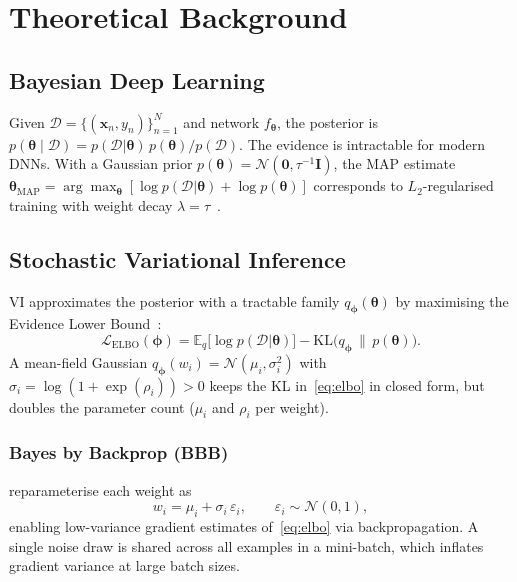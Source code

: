 \documentclass[12pt,a4paper]{article}
\newcommand{\btheta}{\bm{\theta}}
\newcommand{\cD}{\mathcal{D}}
\newcommand{\cN}{\mathcal{N}}
\newcommand{\KL}{\mathrm{KL}}
\newcommand{\ELBO}{\mathcal{L}_{\text{ELBO}}}
\newcommand{\MAP}{\text{MAP}}
\begin{document}
\section{Theoretical Background}
\label{sec:theory}

\subsection{Bayesian Deep Learning}

Given $\cD = \{(\bm{x}_n, y_n)\}_{n=1}^{N}$ and network $f_{\btheta}$, the
posterior is $p(\btheta \mid \cD) = p(\cD|\btheta)\,p(\btheta)/p(\cD)$. The
evidence is intractable for modern DNNs. With a Gaussian prior
$p(\btheta)=\cN(\bm{0},\tau^{-1}\mathbf{I})$, the MAP estimate
$\btheta_{\MAP} = \arg\max_{\btheta}[\log p(\cD|\btheta)+\log p(\btheta)]$
corresponds to $L_2$-regularised training with weight decay
$\lambda=\tau$~\citep{murphy2023pml}.

\subsection{Stochastic Variational Inference}

VI approximates the posterior with a tractable family $q_{\bm\phi}(\btheta)$
by maximising the Evidence Lower Bound~\citep{blundell2015weight,goan2020bayesian}:
\begin{equation}
  \ELBO(\bm\phi)
    = \mathbb{E}_{q}\!\bigl[\log p(\cD|\btheta)\bigr]
    - \KL\bigl(q_{\bm\phi}\,\|\,p(\btheta)\bigr).
  \label{eq:elbo}
\end{equation}
A mean-field Gaussian $q_{\bm\phi}(w_i) = \cN(\mu_i,\sigma_i^2)$ with
$\sigma_i = \log(1+\exp(\rho_i))>0$ keeps the KL in~\eqref{eq:elbo} in
closed form, but doubles the parameter count ($\mu_i$ and $\rho_i$ per
weight).

\subsubsection{Bayes by Backprop (BBB)}

\citet{blundell2015weight} reparameterise each weight as
\begin{equation}
  w_i = \mu_i + \sigma_i\,\varepsilon_i, \qquad \varepsilon_i\sim\cN(0,1),
\end{equation}
enabling low-variance gradient estimates of~\eqref{eq:elbo} via
backpropagation. A single noise draw is shared across all examples in a
mini-batch, which inflates gradient variance at large batch sizes.
\end{document}
